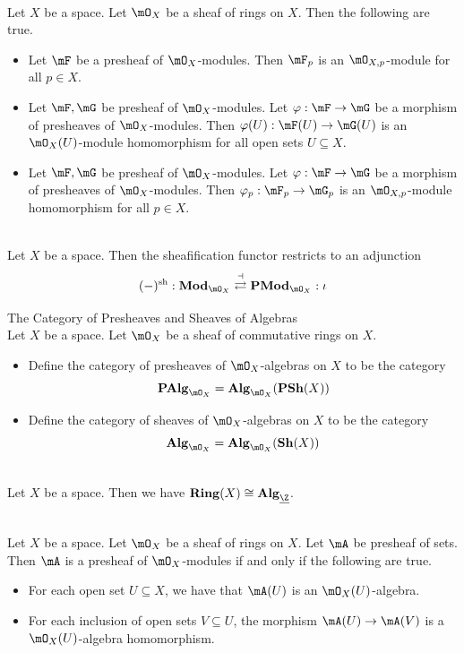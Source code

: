 \documentclass[a4paper]{article}
\begin{document}
\begin{lmm}{}{}\\
Let $X$ be a space. Let $\mO_X$ be a sheaf of rings on $X$. Then the following are true. 
\begin{itemize}
\item Let $\mF$ be a presheaf of $\mO_X$-modules. Then $\mF_p$ is an $\mO_{X,p}$-module for all $p\in X$. 
\item Let $\mF,\mG$ be presheaf of $\mO_X$-modules. Let $\varphi:\mF\to\mG$ be a morphism of presheaves of $\mO_X$-modules. Then $\varphi(U):\mF(U)\to\mG(U)$ is an $\mO_X(U)$-module homomorphism for all open sets $U\subseteq X$. 
\item Let $\mF,\mG$ be presheaf of $\mO_X$-modules. Let $\varphi:\mF\to\mG$ be a morphism of presheaves of $\mO_X$-modules. Then $\varphi_p:\mF_p\to\mG_p$ is an $\mO_{X,p}$-module homomorphism for all $p\in X$. 
\end{itemize}
\end{lmm}

\begin{lmm}{}{}\\
Let $X$ be a space. Then the sheafification functor restricts to an adjunction $$(-)^\text{sh}:\bold{Mod}_{\mO_X}\overset{\dashv}{\rightleftarrows}\bold{PMod}_{\mO_X}:\iota$$
\end{lmm}

\begin{defn}{The Category of Presheaves and Sheaves of Algebras}{}\\
Let $X$ be a space. Let $\mO_X$ be a sheaf of commutative rings on $X$. 
\begin{itemize}
\item Define the category of presheaves of $\mO_X$-algebras on $X$ to be the category $$\bold{PAlg}_{\mO_X}=\bold{Alg}_{\mO_X}(\bold{PSh}(X))$$
\item Define the category of sheaves of $\mO_X$-algebras on $X$ to be the category $$\bold{Alg}_{\mO_X}=\bold{Alg}_{\mO_X}(\bold{Sh}(X))$$
\end{itemize}
\end{defn}

\begin{prp}{}{}\\
Let $X$ be a space. Then we have $\bold{Ring}(X)\cong\bold{Alg}_{\underline{\Z}}$. 
\end{prp}

\begin{prp}{}{}\\
Let $X$ be a space. Let $\mO_X$ be a sheaf of rings on $X$. Let $\mA$ be presheaf of sets. Then $\mA$ is a presheaf of $\mO_X$-modules if and only if the following are true. 
\begin{itemize}
\item For each open set $U\subseteq X$, we have that $\mA(U)$ is an $\mO_X(U)$-algebra. 
\item For each inclusion of open sets $V\subseteq U$, the morphism $\mA(U)\to\mA(V)$ is a $\mO_X(U)$-algebra homomorphism. 
\end{itemize}
\end{prp}
\end{document}
